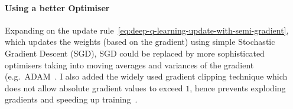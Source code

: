 \paragraph{Using a better Optimiser}


Expanding on the update rule~\eqref{eq:deep-q-learning-update-with-semi-gradient}, which updates the weights (based on the gradient) using simple Stochastic Gradient Descent (SGD), SGD could be replaced by more sophisticated optimisers taking into moving averages and variances of the gradient (e.g.\ ADAM~\cite{kingma2015adamoptimiser}. I also added the widely used gradient clipping \cite{mikolov2012gradientclippingoriginal} technique which does not allow absolute gradient values to exceed $1$, hence prevents exploding gradients and speeding up training~\cite{zhang2020gradientclippingaccelerate}.

